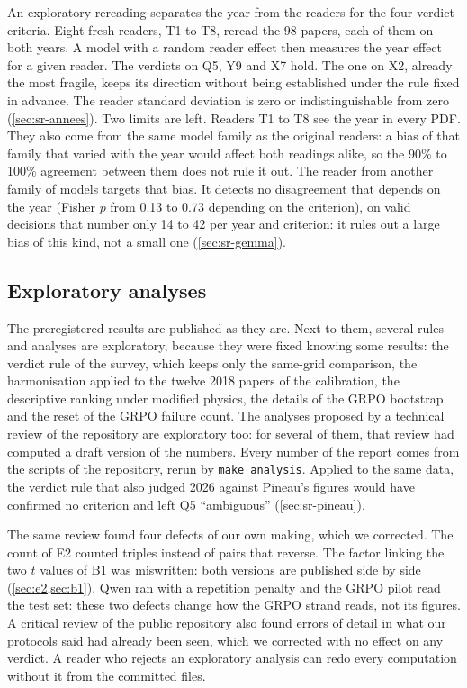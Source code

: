 An exploratory rereading separates the year from the readers for the four verdict
criteria. Eight fresh readers, T1 to T8, reread the 98 papers, each of them on both years. A model with a random reader effect then measures
the year effect for a given reader. The verdicts on Q5, Y9 and X7 hold. The one on X2, already the most
fragile, keeps its direction without being established under the rule fixed in advance. The reader
standard deviation is zero or indistinguishable from zero (\cref{sec:sr-annees}). Two limits are left.
Readers T1 to T8 see the year in every PDF. They also come from the same model family as the original
readers: a bias of that family that varied with the year would affect both readings alike, so the
90\% to 100\% agreement between them does not rule it out. The reader from another family of models
targets that bias. It detects no
disagreement that depends on the year (Fisher $p$ from 0.13 to 0.73 depending on the criterion), on
valid decisions that number only 14 to 42 per year and criterion: it rules out a large bias of this
kind, not a small one (\cref{sec:sr-gemma}).

\subsection{Exploratory analyses}

The preregistered results are published as they are. Next to them, several rules and analyses are
exploratory, because they were fixed knowing some results: the verdict rule of the survey, which
keeps only the same-grid comparison, the harmonisation applied to the twelve 2018 papers of the
calibration, the descriptive ranking under modified physics, the details of the GRPO bootstrap and
the reset of the GRPO failure count. The analyses proposed by a technical review of the repository
are exploratory too: for several of them, that review had computed a draft version of the numbers.
Every number of the report comes from the scripts of the repository, rerun by \texttt{make
analysis}. Applied to the same data, the verdict rule that also judged 2026 against Pineau's figures
would have confirmed no criterion and left Q5 \enquote{ambiguous} (\cref{sec:sr-pineau}).

The same review found four defects of our own making, which we corrected. The count of E2 counted
triples instead of pairs that reverse. The factor linking the two $t$ values of B1 was miswritten:
both versions are published side by side (\cref{sec:e2,sec:b1}). Qwen ran with a repetition penalty
and the GRPO pilot read the test set: these two defects change how the GRPO strand reads, not its
figures. A critical review of the public repository also found errors of detail in what our
protocols said had already been seen, which we corrected with no effect on any verdict. A reader who
rejects an exploratory analysis can redo every computation without it from the committed files.

